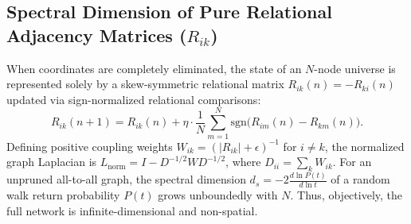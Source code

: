 \documentclass[11pt,a4paper]{article}
\theoremstyle{plain}
\theoremstyle{definition}
\theoremstyle{remark}
\begin{document}
\subsection{Spectral Dimension of Pure Relational Adjacency Matrices ($R_{ik}$)}
When coordinates are completely eliminated, the state of an $N$-node universe is represented solely by a skew-symmetric relational matrix $R_{ik}(n) = -R_{ki}(n)$ updated via sign-normalized relational comparisons:
\begin{equation}
R_{ik}(n+1) = R_{ik}(n) + \eta \cdot \frac{1}{N} \sum_{m=1}^N \mathrm{sgn}\big(R_{im}(n) - R_{km}(n)\big).
\label{eq:pure_relational}
\end{equation}
Defining positive coupling weights $W_{ik} = (|R_{ik}| + \epsilon)^{-1}$ for $i \neq k$, the normalized graph Laplacian is $L_{\mathrm{norm}} = I - D^{-1/2} W D^{-1/2}$, where $D_{ii} = \sum_k W_{ik}$. For an unpruned all-to-all graph, the spectral dimension $d_s = -2 \frac{d \ln P(t)}{d \ln t}$ of a random walk return probability $P(t)$ grows unboundedly with $N$. Thus, objectively, the full network is infinite-dimensional and non-spatial.
\end{document}
